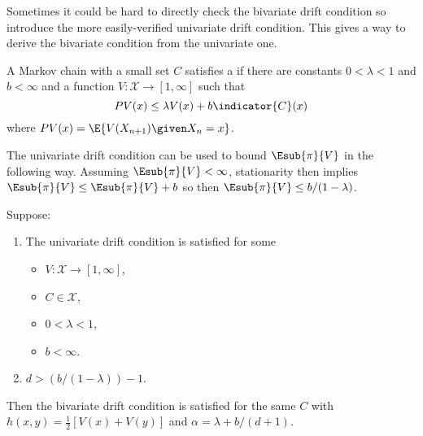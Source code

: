 \documentclass[12pt]{article}
\begin{document}
Sometimes it could be hard to directly check the bivariate drift
condition so introduce the more easily-verified univariate drift
condition.  This gives a way to derive the bivariate condition from the
univariate one.

\begin{definition}
    A Markov chain with a small set \( C \) satisfies a %
    if there are constants \( 0 < \lambda < 1 \) and \( b < \infty \)
    and a function \( V :  \mathcal{X} \to [1, \infty] \) such that
    \[
        PV(x) \le \lambda V(x) + b \indicator{C}(x)
    \] where \( PV(x) = \E{V(X_{n+1}) \given X_n = x} \).
\end{definition}

The univariate drift condition can be used to bound \( \Esub{\pi}{V} \)
in the following way.  Assuming \( \Esub{\pi}{V} < \infty \),
stationarity then implies \( \Esub{\pi}{V} \le \Esub{\pi}{V} + b \) so
then \( \Esub{\pi}{V} \le b/(1-\lambda) \).

\begin{proposition}
    Suppose:
    \begin{enumerate}
        \item
            The univariate drift condition is satisfied for some
            \begin{itemize}
                \item
                    \( V :  \mathcal{X} \to [1,\infty] \),
                \item
                    \( C \in \mathcal{X} \),
                \item
                    \( 0 < \lambda < 1 \),
                \item
                    \( b < \infty \).
            \end{itemize}
        \item
            \( d > ( b/(1-\lambda)) - 1 \).
    \end{enumerate}
    Then the bivariate drift condition is satisfied for the same \( C \)
    with \( h(x,y) = \frac{1}{2}[ V(x) + V(y)] \) and \( \alpha =
    \lambda + b/(d + 1) \).
\end{proposition}
\end{document}
